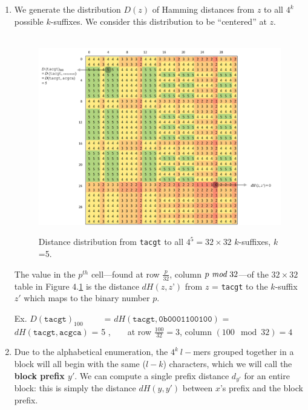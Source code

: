 \documentclass[oneside,12pt]{DISCSthesis}
\begin{document}
{\begin{enumerate}
			\item We generate the distribution $D(z)$ of Hamming distances from $z$ to all $4^{k}$ possible $k$-suffixes. We consider this distribution to be ``centered'' at $z$.

				\begin{figure}[h] \label{fig:D_tacgt}
					\
					\includegraphics[width=6.0in]{img/D(tacgt)_marked_2}
					\caption{Distance distribution from \texttt{tacgt} to all $4^{5} = 32 \times 32$ $k$-suffixes, $k$=5.}
					\end{figure}

			The value in the $p^{th}$ cell---found at row $\frac{p}{32}$, column $p\ \emph{mod}\ 32$---of the $32 \times 32$ table in Figure 4.\ref{fig:D_tacgt} is the distance $dH (z, z’)$ from $z$ = \texttt{tacgt} to the $k$-suffix $z'$ which maps to the binary number $p$.

				{\small\hspace*{40pt}Ex. $D(\texttt{tacgt})_{100}$\ \ \ \ \ = $dH(\texttt{tacgt}, \texttt{0b0001100100})$
				\newline\hspace*{137pt} = $dH(\texttt{tacgt}, \texttt{acgca})$
				\newline\hspace*{137pt} = 5 ,\ \ \ \ at row $\frac{100}{32} = 3$, column $(100\mod 32) = 4$
				}\newline

			\item Due to the alphabetical enumeration, the $4^k\ l-$mers grouped together in a block will all begin with the same ($l - k$) characters, which we will call the {\bf\boldmath block prefix $y'$}. We can compute a single prefix distance $d_{y'}$ for an entire block: this is simply the distance $dH(y, y')$ between $x$'s prefix and the block prefix.


\end{enumerate}}
\end{document}
